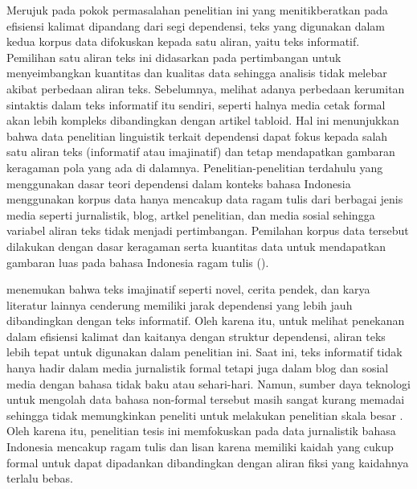 Merujuk pada pokok permasalahan penelitian ini yang menitikberatkan pada efisiensi kalimat dipandang dari segi dependensi, teks yang digunakan dalam kedua korpus data difokuskan kepada satu aliran, yaitu teks informatif. Pemilihan satu aliran teks ini didasarkan pada pertimbangan untuk menyeimbangkan kuantitas dan kualitas data sehingga analisis tidak melebar akibat perbedaan aliran teks. Sebelumnya, \cite{miller2011critical} melihat adanya perbedaan kerumitan sintaktis dalam teks informatif itu sendiri, seperti halnya media cetak formal akan lebih kompleks dibandingkan dengan artikel tabloid. Hal ini menunjukkan bahwa data penelitian linguistik terkait dependensi dapat fokus kepada salah satu aliran teks (informatif atau imajinatif) dan tetap mendapatkan gambaran keragaman pola yang ada di dalamnya. Penelitian-penelitian terdahulu yang menggunakan dasar teori dependensi dalam konteks bahasa Indonesia menggunakan korpus data hanya mencakup data ragam tulis dari berbagai jenis media seperti jurnalistik, blog, artkel penelitian, dan media sosial sehingga variabel aliran teks tidak menjadi pertimbangan. Pemilahan korpus data tersebut dilakukan dengan dasar keragaman serta kuantitas data untuk mendapatkan gambaran luas pada bahasa Indonesia ragam tulis (\citealp{kamayani2011dependency, green2012indonesian, irmawati2015dependency, futrell2015large}). 

\cite{wang2017effects} menemukan bahwa teks imajinatif seperti novel, cerita pendek, dan karya literatur lainnya cenderung memiliki jarak dependensi yang lebih jauh dibandingkan dengan teks informatif. Oleh karena itu, untuk melihat penekanan dalam efisiensi kalimat dan kaitanya dengan struktur dependensi, aliran teks lebih tepat untuk digunakan dalam penelitian ini. Saat ini, teks informatif tidak hanya hadir dalam media jurnalistik formal tetapi juga dalam blog dan sosial media dengan bahasa tidak baku atau sehari-hari. Namun, sumber daya teknologi untuk mengolah data bahasa non-formal tersebut masih sangat kurang memadai sehingga tidak memungkinkan peneliti untuk melakukan penelitian skala besar \citep{green2012indonesian}. Oleh karena itu, penelitian tesis ini memfokuskan pada data jurnalistik bahasa Indonesia mencakup ragam tulis dan lisan karena memiliki kaidah yang cukup formal untuk dapat dipadankan dibandingkan dengan aliran fiksi yang kaidahnya terlalu bebas. 

